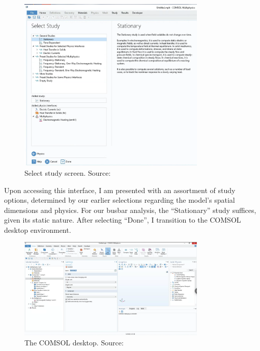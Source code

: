 \begin{figure}[H]
  \centering
  \includegraphics[width=0.8\textwidth]{Chapters/Figures/Chapter 3 Figures/Select Study.png}
  \caption{Select study screen. Source: \cite{multiphysics__modeling_nodate}}
  \label{fig:Select Study}
\end{figure}

Upon accessing this interface, I am presented with an assortment of study options, determined by our earlier selections regarding the model's spatial dimensions and physics. For our busbar analysis, the ``Stationary'' study suffices, given its static nature. After selecting ``Done'', I transition to the COMSOL desktop environment.

\begin{figure}[H]
  \centering
  \includegraphics[width=0.8\textwidth]{Chapters/Figures/Chapter 3 Figures/Initial COMSOL Desktop.png}
  \caption{The COMSOL desktop. Source: \cite{multiphysics__modeling_nodate}}
  \label{fig:The COMSOL desktop}
\end{figure}


